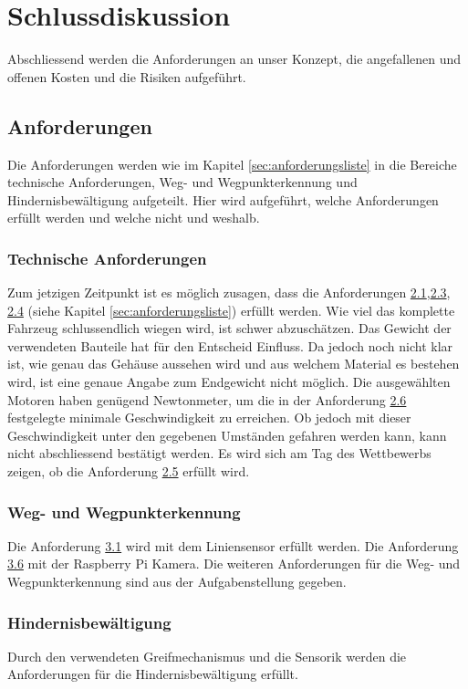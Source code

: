 \documentclass[../main.tex]{subfiles}
\begin{document}
\newpage
\section{Schlussdiskussion}

Abschliessend werden die Anforderungen an unser Konzept, die angefallenen und offenen Kosten und die Risiken aufgeführt. 
\subsection{Anforderungen}
Die Anforderungen werden wie im Kapitel \ref{sec:anforderungsliste} in die Bereiche technische Anforderungen, Weg- und Wegpunkterkennung und Hindernisbewältigung aufgeteilt. Hier wird aufgeführt, welche Anforderungen erfüllt werden und welche nicht und weshalb.

\subsubsection{Technische Anforderungen}
Zum jetzigen Zeitpunkt ist es möglich zusagen, dass die Anforderungen \hyperlink{A2.1}{2.1},\hyperlink{A2.3}{2.3}, \hyperlink{A2.4}{2.4} (siehe Kapitel \ref{sec:anforderungsliste}) erfüllt werden. Wie viel das komplette Fahrzeug schlussendlich wiegen wird, ist schwer abzuschätzen. Das Gewicht der verwendeten Bauteile hat für den Entscheid Einfluss. Da jedoch noch nicht klar ist, wie genau das Gehäuse aussehen wird und aus welchem Material es bestehen wird, ist eine genaue Angabe zum Endgewicht nicht möglich. Die ausgewählten Motoren haben genügend Newtonmeter, um die in der Anforderung \hyperlink{A2.6}{2.6} festgelegte minimale Geschwindigkeit zu erreichen. Ob jedoch mit dieser Geschwindigkeit unter den gegebenen Umständen gefahren werden kann, kann nicht abschliessend bestätigt werden.
Es wird sich am Tag des Wettbewerbs zeigen, ob die Anforderung \hyperlink{A2.5}{2.5} erfüllt wird.

\subsubsection{Weg- und Wegpunkterkennung}
Die Anforderung \hyperlink{A3.1}{3.1} wird mit dem Liniensensor erfüllt werden. Die Anforderung \hyperlink{A3.6}{3.6} mit der Raspberry Pi Kamera. Die weiteren Anforderungen für die Weg- und Wegpunkterkennung sind aus der Aufgabenstellung gegeben.

\subsubsection{Hindernisbewältigung}
Durch den verwendeten Greifmechanismus und die Sensorik werden die Anforderungen für die Hindernisbewältigung erfüllt.
\end{document}
